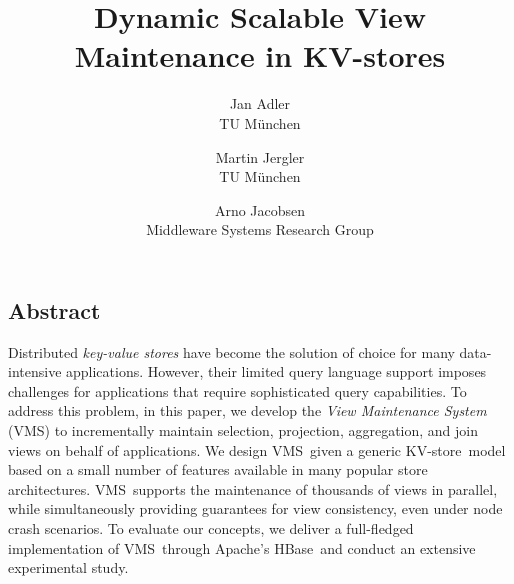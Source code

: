 \documentclass[letterpaper,twocolumn,10pt]{article}
\newcommand{\KVS}{{\small \textsf{KV-store}}}
\newcommand{\HB}{{\small \textsf{HBase}}}
\newcommand{\VMS}{{\small \textsf{VMS}}}
\begin{document}
\let\footnote=\endnote
\date{}

\title{\Large \bf Dynamic Scalable View Maintenance in KV-stores}

\author{
{\rm Jan Adler}\\
TU M\"unchen
\and
{\rm Martin Jergler}\\
TU M\"unchen
\and
{\rm Arno Jacobsen}\\
Middleware Systems Research Group
} %

\maketitle

\thispagestyle{empty}


\subsection*{Abstract}
Distributed \textit{key-value stores} have become the solution of
choice for many data-intensive applications. However, their limited
query language support imposes challenges for applications that
require sophisticated query capabilities.  To address this problem, in
this paper, we develop the \textit{View Maintenance System} (\VMS) to
incrementally maintain selection, projection, aggregation, and join
views on behalf of applications.  We design \VMS\ given a generic
\KVS\ model based on a small number of features available in many
popular store architectures.  \VMS\ supports the maintenance of
thousands of views in parallel, while simultaneously providing
guarantees for view consistency, even under node crash scenarios.  To
evaluate our concepts, we deliver a full-fledged implementation of
\VMS\ through Apache's \HB\ and conduct an extensive experimental
study.




%




\end{document}
